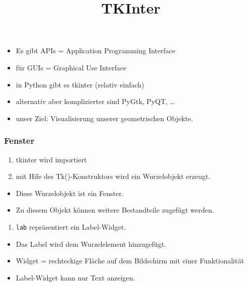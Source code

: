 \documentclass[
  11pt,
  a4paper,
  DIV=11,
  numbers=noendperiod]{scrartcl}
\title{TKInter}
\author{}
\date{}
\providecommand{\tightlist}{%
  \setlength{\itemsep}{0pt}\setlength{\parskip}{0pt}}\usepackage{longtable,booktabs,array}
\begin{document}
\maketitle

\begin{itemize}
\tightlist
\item
  Es gibt APIs = Application Programming Interface
\item
  für GUIs = Graphical Use Interface
\item
  in Python gibt es tkinter (relativ einfach)
\item
  alternativ aber komplizierter sind PyGtk, PyQT, \ldots{}
\item
  unser Ziel: Visualisierung unserer geometrischen Objekte.
\end{itemize}

\subsubsection{Fenster}\label{fenster}

\begin{enumerate}
\def\labelenumi{\arabic{enumi}.}
\item
  tkinter wird importiert
\item
  mit Hife des Tk()-Konstruktors wird ein Wurzelobjekt erzeugt.
\end{enumerate}

\begin{itemize}
\tightlist
\item
  Diese Wurzelobjekt ist ein Fenster.
\item
  Zu diesem Objekt können weitere Bestandteile zugefügt werden.
\end{itemize}

\begin{enumerate}
\def\labelenumi{\arabic{enumi}.}
\setcounter{enumi}{2}
\tightlist
\item
  \texttt{lab} repräsentiert ein Label-Widget.
\end{enumerate}

\begin{itemize}
\tightlist
\item
  Das Label wird dem Wurzelelement hinzugefügt.
\item
  Widget = rechteckige Fläche auf dem Bildschirm mit einer
  Funktionalität
\item
  Label-Widget kann nur Text anzeigen.
\end{itemize}
\end{document}
